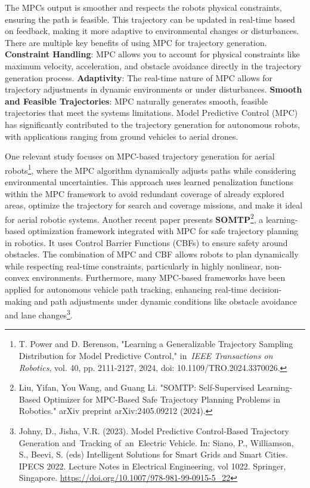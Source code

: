The MPC\textquotesingle s output is smoother and respects the
robot\textquotesingle s physical constraints, ensuring the path is
feasible. This trajectory can be updated in real-time based on feedback,
making it more adaptive to environmental changes or disturbances. There
are multiple key benefits of using MPC for trajectory generation.
\textbf{Constraint Handling}: MPC allows you to account for physical
constraints like maximum velocity, acceleration, and obstacle avoidance
directly in the trajectory generation process. \textbf{Adaptivity}: The
real-time nature of MPC allows for trajectory adjustments in dynamic
environments or under disturbances. \textbf{Smooth and Feasible
Trajectories}: MPC naturally generates smooth, feasible trajectories
that meet the system\textquotesingle s limitations. Model Predictive
Control (MPC) has significantly contributed to the trajectory generation
for autonomous robots, with applications ranging from ground vehicles to
aerial drones.

One relevant study focuses on MPC-based trajectory generation for aerial
robots\footnote{T. Power and D. Berenson, "Learning a Generalizable
  Trajectory Sampling Distribution for Model Predictive Control,"
  in~\emph{IEEE Transactions on Robotics}, vol. 40, pp. 2111-2127, 2024,
  doi: 10.1109/TRO.2024.3370026.}, where the MPC algorithm dynamically
adjusts paths while considering environmental uncertainties. This
approach uses learned penalization functions within the MPC framework to
avoid redundant coverage of already explored areas, optimize the
trajectory for search and coverage missions, and make it ideal for
aerial robotic systems. Another recent paper presents
\textbf{SOMTP}\footnote{Liu, Yifan, You Wang, and Guang Li. "SOMTP:
  Self-Supervised Learning-Based Optimizer for MPC-Based Safe Trajectory
  Planning Problems in Robotics." arXiv preprint arXiv:2405.09212
  (2024).}, a learning-based optimization framework integrated with MPC
for safe trajectory planning in robotics. It uses Control Barrier
Functions (CBFs) to ensure safety around obstacles. The combination of
MPC and CBF allows robots to plan dynamically while respecting real-time
constraints, particularly in highly nonlinear, non-convex environments.
Furthermore, many MPC-based frameworks have been applied for autonomous
vehicle path tracking, enhancing real-time decision-making and path
adjustments under dynamic conditions like obstacle avoidance and lane
changes\footnote{Johny, D., Jisha, V.R. (2023). Model Predictive
  Control-Based Trajectory Generation and~Tracking of~an~Electric
  Vehicle. In: Siano, P., Williamson, S., Beevi, S. (eds) Intelligent
  Solutions for Smart Grids and Smart Cities. IPECS 2022. Lecture Notes
  in Electrical Engineering, vol 1022. Springer, Singapore.
  \url{https://doi.org/10.1007/978-981-99-0915-5_22}}.

